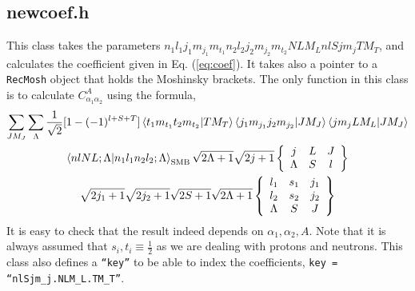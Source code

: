 \documentclass[10pt]{article}
\begin{document}
\subsection{newcoef.h}
This class takes the parameters $n_1 l_1 j_1 m_{j_1} m_{t_1} n_2 l_2 j_2 m_{j_2} m_{t_2} N L M_L n l S j m_j T M_T$, and calculates the coefficient given in Eq. (\ref{eq:coef}). It takes also a pointer to a \texttt{RecMosh} object that holds the Moshinsky brackets. The only function in this class is to calculate $C_{\alpha_1 \alpha_2}^{A}$ using the formula,
\begin{multline}
	\sum_{J M_J} \sum_{\Lambda} 
	\frac{1}{\sqrt{2}} [ 1 - (-1)^{l+S+T}] \braket{ t_1 m_{t_1} t_2 m_{t_2} | T M_T }
	\braket{ j_1 m_{j_1} j_2 m_{j_2} | J M_J}
	\braket{ j m_j L M_L | J M_J } \\
	\braket{ n l N L; \Lambda | n_1 l_1 n_2 l_2 ; \Lambda}_{\textrm{SMB}}
	\sqrt{2 \Lambda + 1} \sqrt{ 2j+1}
	\left\{
	\begin{array}{ccc}
		j & L & J \\
		\Lambda & S & l
	\end{array}
	\right\} \\
	\sqrt{2j_1 + 1} \sqrt{2j_2 + 1} \sqrt{ 2S + 1} \sqrt{ 2 \Lambda + 1}
	\left\{
	\begin{array}{ccc}
		l_1 & s_1 & j_1 \\
		l_2 & s_2 & j_2 \\
		\Lambda & S & J \\
	\end{array}
	\right\}
\end{multline}
It is easy to check that the result indeed depends on $\alpha_1, \alpha_2, A$. Note that it is always assumed that $s_i,t_i \equiv \frac{1}{2}$ as we are dealing with protons and neutrons.
This class also defines a \texttt{``key''} to be able to index the coefficients, \texttt{key = ``nlSjm\_j.NLM\_L.TM\_T''}.
\end{document}
